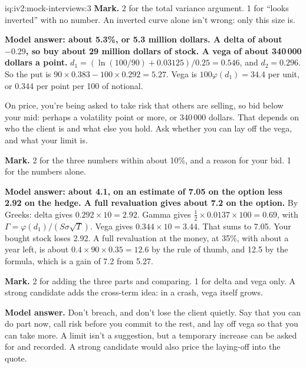 \begin{solution}{iq:iv2:mock-interviews:3}
\textbf{Mark.} 2 for the total variance argument. 1 for ``looks inverted'' with no number. An inverted curve alone isn't wrong: only this size is.

\ivstop
\textbf{Model answer: about 5.3\%, or 5.3 million dollars. A delta of about $-0.29$, so buy about 29 million dollars of stock. A vega of about 340\,000 dollars a point.} $d_1 = (\ln(100/90) + 0.03125)/0.25 = 0.546$, and $d_2 = 0.296$. So the put is $90 \times 0.383 - 100 \times 0.292 = 5.27$. Vega is $100\varphi(d_1) = 34.4$ per unit, or 0.344 per point per 100 of notional.

On price, you're being asked to take risk that others are selling, so bid below your mid: perhaps a volatility point or more, or 340\,000 dollars. That depends on who the client is and what else you hold. Ask whether you can lay off the vega, and what your limit is.

\textbf{Mark.} 2 for the three numbers within about 10\%, and a reason for your bid. 1 for the numbers alone.

\ivstop
\textbf{Model answer: about 4.1, on an estimate of 7.05 on the option less 2.92 on the hedge. A full revaluation gives about 7.2 on the option.} By Greeks: delta gives $0.292 \times 10 = 2.92$. Gamma gives $\tfrac12 \times 0.0137 \times 100 = 0.69$, with $\Gamma = \varphi(d_1)/(S\sigma\sqrt{T})$. Vega gives $0.344 \times 10 = 3.44$. That sums to 7.05. Your bought stock loses 2.92. A full revaluation at the money, at 35\%, with about a year left, is about $0.4 \times 90 \times 0.35 = 12.6$ by the rule of thumb, and 12.5 by the formula, which is a gain of 7.2 from 5.27.

\textbf{Mark.} 2 for adding the three parts and comparing. 1 for delta and vega only. A strong candidate adds the cross-term idea: in a crash, vega itself grows.

\ivstop
\textbf{Model answer.} Don't breach, and don't lose the client quietly. Say that you can do part now, call risk before you commit to the rest, and lay off vega so that you can take more. A limit isn't a suggestion, but a temporary increase can be asked for and recorded. A strong candidate would also price the laying-off into the quote.


\end{solution}
